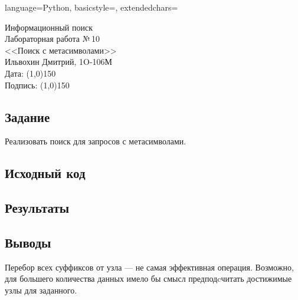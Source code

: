 \documentclass[12pt]{article}
\newcommand{\StudentName}{Ильвохин Дмитрий}
\newcommand{\Group}{1O-106М}
\newcommand{\CourseName}{Информационный поиск}
\newcommand{\LabNum}{10}
\newcommand{\Subject}{Поиск с метасимволами}
\begin{document}
\lstset
{
        language=Python,
        basicstyle=\footnotesize,%
        extendedchars=\true
}

\begin{flushright}
\Large{
	\CourseName \\
	Лабораторная работа №\,\LabNum \\
	<<\Subject>> \\
  \StudentName, \Group \\
  Дата: \line(1,0){150} \\
  Подпись: \line(1,0){150} \\
}
\end{flushright}

\subsection*{Задание}
Реализовать поиск для запросов с метасимволами.

\subsection*{Исходный код}




\subsection*{Результаты}


\subsection*{Выводы}
Перебор всех суффиксов от узла --- не самая эффективная операция.
Возможно, для большего количества данных имело бы смысл предподcчитать
достижимые узлы для заданного.
\end{document}
